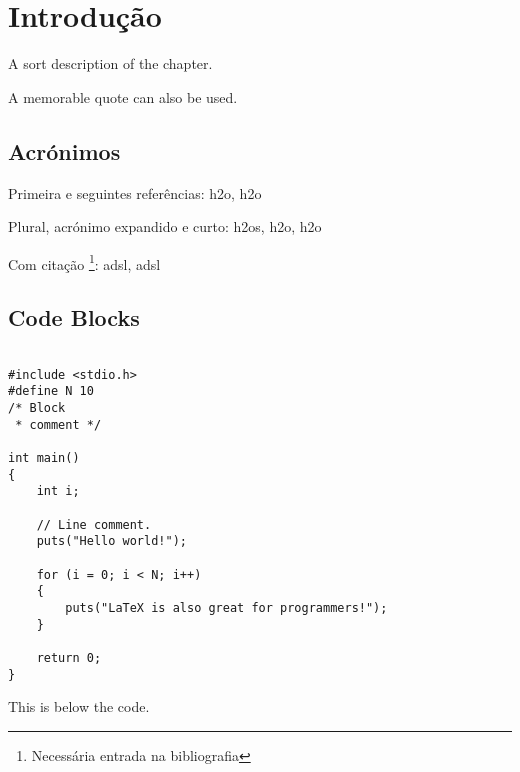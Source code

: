 

\chapter{Introdução}
\label{chapter:introduction}

\begin{introduction}
A sort description of the chapter.

A memorable quote can also be used.
\end{introduction}



\section{Acrónimos}

Primeira e seguintes referências: \ac{h2o}, \ac{h2o}

Plural, acrónimo expandido e curto: \acp{h2o}, \acs{h2o}, \acl{h2o}

Com citação \footnote{Necessária entrada na bibliografia}: \ac{adsl}, \ac{adsl}


\section{Code Blocks}

\begin{listing}
\begin{verbatim}

#include <stdio.h>
#define N 10
/* Block
 * comment */
 
int main()
{
    int i;
 
    // Line comment.
    puts("Hello world!");
 
    for (i = 0; i < N; i++)
    {
        puts("LaTeX is also great for programmers!");
    }
 
    return 0;
}
\end{verbatim}
\caption{This is below the code.}
\label{lbl:snippet-test}
\end{listing}

\lipsum[5]

